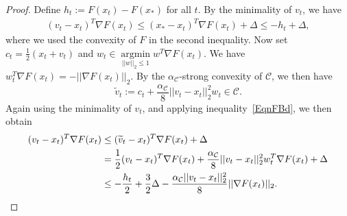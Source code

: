 \documentclass{article}
\begin{document}
\begin{proof}
Define $h_t := F(x_t) - F(x_{*})$ for all $t$. By the minimality of $v_t$, we have
\begin{align}
\label{EqnFBd}
(v_t - x_t)^T\nabla F(x_t) \leq (x_{*} - x_t)^T \nabla F(x_t) + \Delta \leq -h_t + \Delta,
\end{align}
where we used the convexity of $F$ in the second inequality. Now set $c_t = \frac{1}{2}(x_t + v_t)$ and $w_t \in \mathop{\arg\min}\limits_{||w||_2 \leq 1}w^T\nabla F(x_t)$. We have $w_t^T\nabla F(x_t) = -||\nabla F(x_t)||_2$. By the $\alpha_{\mathcal{C}}$-strong convexity of $\mathcal{C}$, we then have 
$$\widetilde{v}_t := c_t + \frac{\alpha_{\mathcal{C}}}{8}||v_t - x_t||_2^2w_t \in \mathcal{C}.$$
Again using the minimality of $v_t$, and applying inequality~\eqref{EqnFBd}, we then obtain
\begin{align}
\label{eq:dif1V3}
(v_t - x_t)^T \nabla F(x_t) &\leq (\widetilde{v}_t - x_t)^T \nabla F(x_t) + \Delta \notag\\
&= \frac{1}{2}(v_t - x_t)^T \nabla F(x_t) + \frac{\alpha_{\mathcal{C}}}{8}||v_t - x_t||_2^2w_t^T \nabla F(x_t) + \Delta \notag\\
&\leq -\frac{h_t}{2} + \frac{3}{2}\Delta - \frac{\alpha_{\mathcal{C}}||v_t - x_t||_2^2}{8}||\nabla F(x_t)||_2.
\end{align}


\end{proof}
\end{document}

